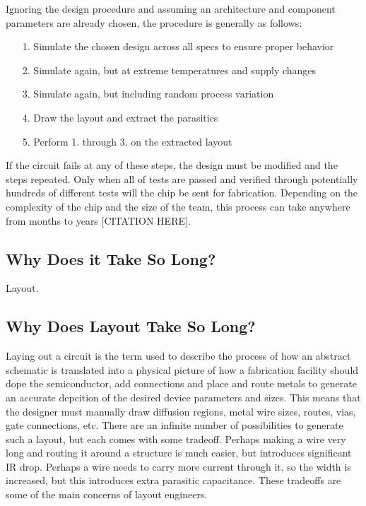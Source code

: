 Ignoring the design procedure and assuming an architecture and component parameters are already chosen, the procedure is generally as follows:
\begin{itemize}
\item[1.] Simulate the chosen design across all specs to ensure proper behavior
\item[2.] Simulate again, but at extreme temperatures and supply changes
\item[3.] Simulate again, but including random process variation
\item[4.] Draw the layout and extract the parasitics
\item[5.] Perform 1. through 3. on the extracted layout
\end{itemize}


If the circuit fails at any of these steps, the design must be modified and the steps repeated. Only when all of tests are passed and verified through potentially hundreds of different tests will the chip be sent for fabrication. Depending on the complexity of the chip and the size of the team, this process can take anywhere from months to years [CITATION HERE].
\subsection{Why Does it Take So Long?}
Layout.

\subsection{Why Does Layout Take So Long?}
Laying out a circuit is the term used to describe the process of how an abstract schematic is translated into a physical picture of how a fabrication facility should dope the semiconductor, add connections and place and route metals to generate an accurate depcition of the desired device parameters and sizes. This means that the designer must manually draw diffusion regions, metal wire sizes, routes, vias, gate connections, etc. There are an infinite number of possibilities to generate such a layout, but each comes with some tradeoff. Perhaps making a wire very long and routing it around a structure is much easier, but introduces significant IR drop. Perhaps a wire needs to carry more current through it, so the width is increased, but this introduces extra parasitic capacitance. These tradeoffs are some of the main concerns of layout engineers. 

